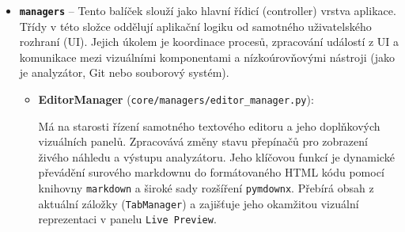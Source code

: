 \documentclass[12pt, a4paper]{article}
\begin{document}
\begin{itemize}
\begin{itemize}
        \item \textbf{FormattingValidator} (\texttt{core/analyzer/formatting\_validator.py}):

        Soustředí kontroly nízkoúrovňového formátování textu. Hlídá liché počty hvězdiček
        (neuzavřený bold \texttt{**} nebo italic \texttt{*}, bullet markery jsou z řádku odfiltrovány),
        obrázky bez alt textu (\texttt{![](url)}), správnou skladbu tabulek a přítomnost
        Unicode \emph{replacement} znaku (\texttt{\textbackslash ufffd}), který indikuje
        poškozené kódování souboru.

        \item \textbf{LinkValidator} (\texttt{core/analyzer/links\_validator.py}):

        Validuje markdown odkazy na úrovni celého projektu pomocí globálního indexu souborů
        (\texttt{project\_index}). Ověřuje, že každý relativní odkaz na \texttt{.md} soubor existuje
        v projektu, že vzájemné odkazy mezi vzory v sekci \emph{Related Patterns} jsou reciproční
        (pokud vzor A odkazuje na vzor B, musí B odkazovat zpět na A) a že popisek odkazu odpovídá
        názvu cílového souboru nebo některému z jeho aliasů uvedených v sekci \emph{Also Known As}.
        Pro indexové šablony lze kontrolu aliasů přeskočit přepínačem \texttt{skip\_alias\_check}.
    \end{itemize}

    \item \textbf{\texttt{managers}} -- Tento balíček slouží jako hlavní řídicí (controller) vrstva aplikace. 
    Třídy v této složce oddělují aplikační logiku od samotného uživatelského rozhraní (UI). 
    Jejich úkolem je koordinace procesů, zpracování událostí z UI a komunikace mezi vizuálními 
    komponentami a nízkoúrovňovými nástroji (jako je analyzátor, Git nebo souborový systém).
    \begin{itemize}
        \item \textbf{EditorManager} (\texttt{core/managers/editor\_manager.py}):
        
        Má na starosti řízení samotného textového editoru a jeho doplňkových vizuálních panelů. 
        Zpracovává změny stavu přepínačů pro zobrazení živého náhledu a výstupu analyzátoru. Jeho klíčovou funkcí je 
        dynamické převádění surového markdownu do formátovaného HTML kódu pomocí knihovny \texttt{markdown} a 
        široké sady rozšíření \texttt{pymdownx}. Přebírá obsah z aktuální záložky (\texttt{TabManager}) a 
        zajišťuje jeho okamžitou vizuální reprezentaci v panelu \texttt{Live Preview}.


\end{itemize}
\end{itemize}
\end{document}
